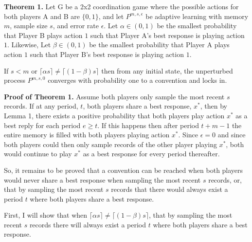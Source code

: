\documentclass[12pt]{article}
\begin{document}
\pagebreak

\textbf{Theorem 1.} Let G be a 2x2 coordination game where the possible actions for both players A and B are $\{0 ,1 \}$, and let $P^{m,s,\epsilon}$ be adaptive learning with memory $m$, sample size $s$, and error rate $\epsilon$. Let $\alpha \in (0,1)$ be the smallest probability that Player B plays action $1$ such that Player A's best response is playing action $1$. Likewise, Let $\beta \in (0,1)$ be the smallest probability that Player A plays action $1$ such that Player B's best response is playing action $1$. 

\vskip12pt

If $s < m$ or $\lceil \alpha s \rceil \neq \lceil (1-\beta) s \rceil$ then from any initial state, the unperturbed process $P^{m,s,0}$ converges with probability one to a convention and locks in.

\vskip24pt

\textbf{Proof of Theorem 1.}
Assume both players only sample the most recent $s$ records. If at any period, $t$, both players share a best response, $x^*$, then by Lemma 1, there exists a positive probability that both players play action $x^*$ as a best reply for each period $e \geq t$. If this happens then after period $t+m-1$ the entire memory is filled with both players playing action $x^*$. Since $\epsilon=0$ and since both players could then only sample records of the other player playing $x^*$, both would continue to play $x^*$ as a best response for every period thereafter.

\vskip12pt

So, it remains to be proved that a convention can be reached when both players would never share a best response when sampling the most recent $s$ records, or, that by sampling the most recent $s$ records that there would always exist a period $t$ where both players share a best response.

\vskip12pt

First, I will show that when $\lceil \alpha s \rceil \neq \lceil (1-\beta) s \rceil$, that by sampling the most recent $s$ records there will always exist a period $t$ where both players share a best response. 

\vskip12pt
\end{document}
